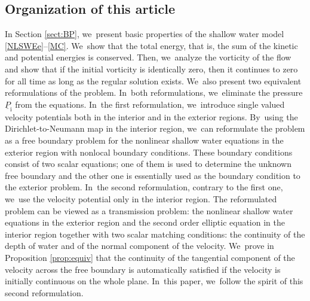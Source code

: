 \documentclass[11pt]{article}
\newcommand{\ul}[1]{\underline{#1}}
\theoremstyle{definition}
\begin{document}
\subsection{Organization of this article}
In Section \ref{sect:BP}, we~present basic properties of the shallow water model \eqref{NLSWEe}--\eqref{MC}. We~show that the total energy, that is, the sum of the kinetic and potential energies is conserved.
Then, we~analyze the vorticity of the flow and show that if the initial vorticity is identically zero,
then it continues to zero for all time as long as the regular solution exists. We~also present two equivalent reformulations of the problem. In~both reformulations, we~eliminate the pressure $\ul{P}_\mathrm{i}$ from the equations. In~the first reformulation, we~introduce single valued velocity potentials both in the interior and in the exterior regions. By~using the Dirichlet-to-Neumann map in the interior region, we~can reformulate the problem as a free boundary problem for the nonlinear shallow water equations
in the exterior region with nonlocal boundary conditions.
These boundary conditions consist of two scalar equations;
one of them is used to determine the unknown free boundary and the other one is essentially used as the boundary condition to the exterior problem. In~the second reformulation, contrary to the first one, we~use the velocity potential only in the interior region.
The reformulated problem can be viewed as a transmission problem:
the nonlinear shallow water equations in the exterior region and the second order elliptic equation in the interior region
together with two scalar matching conditions: the continuity of the depth of water and of the normal component of the velocity. We~prove in Proposition \ref{prop:equiv} that the continuity of the tangential component of the velocity across the free boundary is automatically satisfied
if the velocity is initially continuous on the whole plane. In~this paper, we~follow the spirit of this second reformulation.
\end{document}
